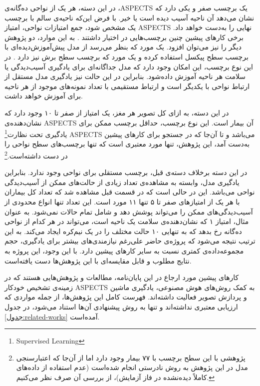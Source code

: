 در این دسته، 
هر یک از نواحی ده‌گانه‌ی ،ASPECTS
یک برچسب صفر و یکی دارد که نشان می‌دهد آن ناحیه آسیب دیده است یا خیر.
با فرض این‌که ناحیه‌ی سالم با برچسب یک مشخص شود، جمع امتیازات نواحی، امتیاز ASPECTS نهایی را به‌دست خواهد داد.
برخی کار‌های پیشین
چنین برچسب‌هایی در اختیار داشتند \cite{lee2023clinical,jung2018evaluating,kuang2019automated}.
به این موارد، دو پژوهش دیگر را نیز می‌توان افزود.
یک مورد که بنظر می‌رسد از مدل پیش‌آموزش‌دیده‌ای با برچسب سطح پیکسل استفاده کرده 
\cite{naganuma2021alberta}
و یک مورد که برچسب سطح برش نیز دارد \cite{chiang2022deep}.
در این نوع برچسب، این امکان وجود دارد که مدل جداگانه‌ای برای یادگیری
آسیب‌دیدگی یا سلامت هر ناحیه آموزش داده‌شود.
بنابراین در این حالت نیز یادگیری مدل مستقل از ارتباط نواحی با یکدیگر است و ارتباط مستقیمی با تعداد نمونه‌های موجود از هر ناحیه برای آموزش خواهد داشت.

در این دسته، به ازای کل تصویر هر مغز، 
یک امتیاز از صفر تا ۱۰ وجود دارد که نشان‌دهنده‌ی ASPECTS آن بیمار است.
این نوع برچسب، حداقل برچسب ممکن برای 
یادگیری تحت نظارت\footnote{Supervised Learning} 
ASPECTS می‌باشد و
تا آن‌جا که در جستجو برای کار‌های پیشین به‌دست آمد، این پژوهش، تنها مورد معتبری
است که تنها برچسب‌های سطح نواحی را در دست داشته‌است.\footnote{پژوهشی با این سطح برچسب با ۷۷ بیمار وجود دارد 
\cite{golkonda2022automated}
اما از آن‌جا که اعتبارسنجی مدل در این پژوهش به روش نادرستی انجام شده‌است (عدم استفاده از داده‌های کاملاً دیده‌نشده در فاز آزمایش)، از بررسی آن صرف نظر می‌کنیم.}

در این دسته برخلاف دسته‌ی قبل، برچسب  مستقلی برای نواحی وجود ندارد.
بنابراین 
یادگیری مدل، وابسته به مشاهده‌ی تعداد زیادی از حالت‌های ممکن از آسیب‌دیدگی نواحی می‌باشد.
این در حالی است که در قسمت قبل مشاهده شد که تعداد کل بیماران با هر یک از امتیازهای صفر تا ۵ تنها ۱۱ مورد است.
این تعداد تنها انواع محدودی از آسیب‌دیدگی‌های ممکن را می‌تواند پوشش دهد و شامل تمام حالات نمی‌شود. 
به عنوان مثال، امتیاز ۱ که نشان‌دهنده‌ی سلامت یک ناحیه است، می‌تواند در هر کدام از نواحی ده‌گانه رخ بدهد که به تنهایی ۱۰ حالت مختلف را در یک نیم‌کره ایجاد می‌کند. 
به این ترتیب نتیجه می‌شود که پروژه‌ی حاضر علی‌رغم نیازمندی‌های بیشتر برای یادگیری، حجم مجموعه‌داده‌ی کمتری نسبت به سایر کار‌های پیشین دارد.
با این وجود، این پروژه به نتایج مطلوب و قابل مقایسه‌ای با این پژوهش‌ها دست یافته‌است.



کار‌های پیشین مورد ارجاع در این پایان‌نامه، مطالعات و پژوهش‌هایی هستند که 
در زمینه‌ی تشخیص خودکار ASPECTS به کمک روش‌های هوش مصنوعی، یادگیری ماشین و پردازش تصویر فعالیت داشته‌اند.
فهرست کامل این پژوهش‌ها، از جمله مواردی که ارزیابی معتبری نداشته‌اند و تنها به روش پیشنهادی آن‌ها استناد می‌شود، در جدول 
\ref{جدول:related-works}
آمده‌است.

